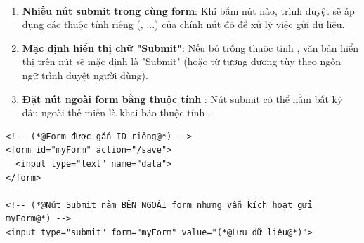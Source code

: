 \begin{browserWindow}
\sffamily\small
{} \\[6pt]
 \quad
{} \quad
{}
\end{browserWindow}

\begin{warnBox}
\begin{enumerate}[leftmargin=1.5em, itemsep=3pt, parsep=0pt]
    \item \textbf{Nhiều nút submit trong cùng form}: Khi bấm nút nào, trình duyệt sẽ áp dụng các thuộc tính riêng (, ...) của chính nút đó để xử lý việc gửi dữ liệu.
    \item \textbf{Mặc định hiển thị chữ "Submit"}: Nếu bỏ trống thuộc tính , văn bản hiển thị trên nút sẽ mặc định là "Submit" (hoặc từ tương đương tùy theo ngôn ngữ trình duyệt người dùng).
    \item \textbf{Đặt nút ngoài form bằng thuộc tính }: Nút submit có thể nằm bất kỳ đâu ngoài thẻ  miễn là khai báo thuộc tính .
\end{enumerate}
\end{warnBox}

\begin{codeWindow}
\begin{lstlisting}[language=HTML5]
<!-- (*@Form được gắn ID riêng@*) -->
<form id="myForm" action="/save">
  <input type="text" name="data">
</form>

<!-- (*@Nút Submit nằm BÊN NGOÀI form nhưng vẫn kích hoạt gửi myForm@*) -->
<input type="submit" form="myForm" value="(*@Lưu dữ liệu@*)">
\end{lstlisting}
\end{codeWindow}

